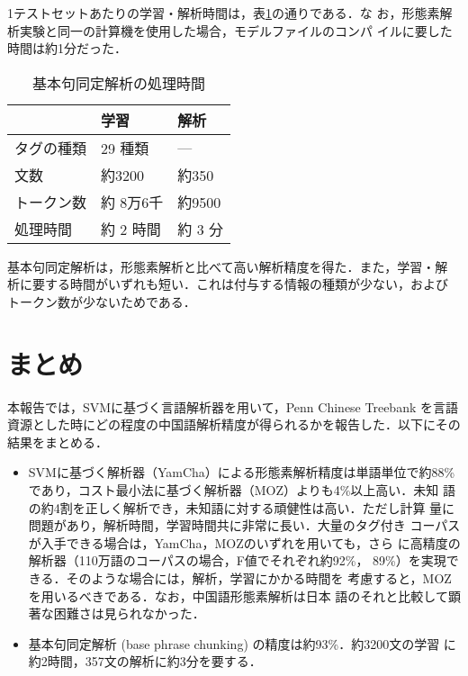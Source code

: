 1テストセットあたりの学習・解析時間は，表\ref{BphTime}の通りである．な
お，形態素解析実験と同一の計算機を使用した場合，モデルファイルのコンパ
イルに要した時間は約1分だった．

\begin{table}[htb]
 \begin{center}
  \caption{基本句同定解析の処理時間}
  \begin{tabular}{l|ll} \hline
                  & 学習    & 解析 \\
\hline
    タグの種類    & 29 種類 &---  \\ 
    文数          & 約3200  & 約350\\
    トークン数 & 約 8万6千 & 約9500  \\ 
    処理時間      & 約 2 時間 & 約 3 分\\ 
\hline
  \end{tabular}
  \label{BphTime}
 \end{center}
\end{table}

基本句同定解析は，形態素解析と比べて高い解析精度を得た．また，学習・解
析に要する時間がいずれも短い．これは付与する情報の種類が少ない，および
トークン数が少ないためである．

\section{まとめ}
本報告では，SVMに基づく言語解析器を用いて，Penn Chinese Treebank を言語
資源とした時にどの程度の中国語解析精度が得られるかを報告した．以下にその
結果をまとめる．

\begin{itemize}
\item 
      SVMに基づく解析器（YamCha）による形態素解析精度は単語単位で約88\%
      であり，コスト最小法に基づく解析器（MOZ）よりも4\%以上高い．未知
      語の約4割を正しく解析でき，未知語に対する頑健性は高い．ただし計算
      量に問題があり，解析時間，学習時間共に非常に長い．大量のタグ付き
      コーパスが入手できる場合は，YamCha，MOZのいずれを用いても，さら
      に高精度の解析器（110万語のコーパスの場合，F値でそれぞれ約92\%，
      89\%）を実現できる．そのような場合には，解析，学習にかかる時間を
      考慮すると，MOZを用いるべきである．なお，中国語形態素解析は日本
      語のそれと比較して顕著な困難さは見られなかった．

\item
      基本句同定解析 (base phrase chunking) の精度は約93\%．約3200文の学習
      に約2時間，357文の解析に約3分を要する．
\end{itemize}
\vspace*{8mm}

